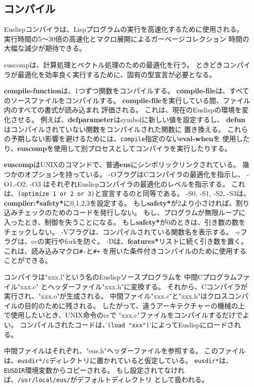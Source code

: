 \newpage


\subsection{コンパイル}\label{compiler}

Euslispコンパイラは、Lispプログラムの実行を高速化するために使用される。
実行時間の5〜30倍の高速化とマクロ展開によるガーベージコレクション
時間の大幅な減少が期待できる。

euscompは、計算処理とベクトル処理のための最適化を行う。
ときどきコンパイラが最適化を効率良く実行するために、固有の型宣言が必要となる。

{\bf compile-function}は、1つずつ関数をコンパイルする。
{\bf compile-file}は、すべてのソースファイルをコンパイルする。
{\bf compile-file}を実行している間、ファイル内のすべての書式が読み込まれ
評価される。
これは、現在のEuslispの環境を変化させる。
例えば、{\bf defparameter}はsymbolに新しい値を設定するし、
{\bf defun}はコンパイルされていない関数をコンパイルされた関数に
置き換える。
これらの予期しない影響を避けるためには、{\tt compile}指定のない{\bf eval-when}を
使用したり、{\bf euscomp}を使用して別プロセスとしてコンパイラを実行したりする。

{\bf euscomp}はUNIXのコマンドで、普通{\bf eus}にシンボリックリンクされている。
幾つかのオプションを持っている。
-OフラグはCコンパイラの最適化を指示し、
-O1,-O2, -O3 はそれぞれEuslispコンパイラの最適化のレベルを指示する。
これは、{\tt (optimize 1 or 2 or 3)}と宣言するのと同等である。
-S0, -S1, -S2, -S3は、{\bf compiler:*safety*}に0,1,2,3を設定する。
もし{\bf *safety*}が2より小さければ、割り込みチェックのためのコードを発行しない。
もし、プログラムが無限ループに入ったとき、制御を失うことになる。
もし{\bf *safety*}が0のときは、引き数の数をチェックしない。
-Vフラグは、コンパイルされている関数名を表示する。
-cフラグは、ccの実行やforkを防ぐ。
-Dは、{\bf *features*}リストに続く引き数を置く。
これは、読み込みマクロ{\tt \#-}と{\tt \#+}
を用いた条件付きコンパイルのために使用することができる。

コンパイラは"xxx.l"という名のEuslispソースプログラムを
中間Cプログラムファイル"xxx.c"
とヘッダーファイル"xxx.h"に変換する。
それから、Cコンパイラが実行され、"xxx.o"が生成される。
中間ファイル"xxx.c"と"xxx.h"はクロスコンパイルの目的のために残される。
したがって、違うアーキテクチャーの機械の上で使用したいとき、UNIX命令のccで
"xxx.c"ファイルをコンパイルするだけでよい。
コンパイルされたコードは、'{\tt (load "xxx")}'によってEuslispにロードされる。

中間ファイルはそれぞれ、"eus.h"ヘッダーファイルを参照する。
このファイルは、{\tt *eusdir*/c}ディレクトリに置かれていると仮定している。
{\tt *eusdir*}は、{\tt EUSDIR}環境変数からコピーされる。
もし設定されてなければ、{\tt /usr/local/eus/}がデフォルトディレクトリ
として扱われる。

